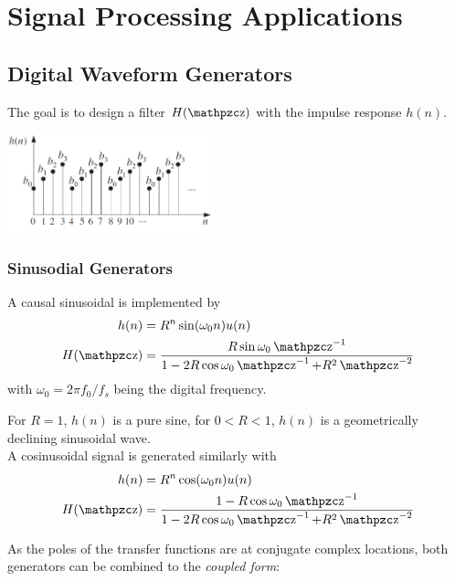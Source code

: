 \section{Signal Processing Applications}
\subsection{Digital Waveform Generators}

The goal is to design a filter $H(\z)$ with the impulse response $h(n)$.

\begin{center} %
	\includegraphics[width=6cm]{images/SignProcApp_DigWaveFormGenerator.jpg}
\end{center}

\subsubsection{Sinusodial Generators}
A causal sinusoidal is implemented by
\begin{align*}
	h(n) &= R^n \sin(\omega_0 n)u(n) \\
	H(\z) &= \frac{R \sin \omega_0 \z^{-1}}{1-2R\cos \omega_0 \z^{-1} + R^2 \z^{-2}}
\end{align*}
with $\omega_0 = 2 \pi f_0 / f_s$ being the digital frequency. 

For $R=1$, $h(n)$ is a pure sine, for $0<R<1$, $h(n)$ is a geometrically declining sinusoidal wave. \\

A cosinusoidal signal is generated similarly with
\begin{align*}
	h(n) &= R^n \cos(\omega_0 n)u(n) \\
	H(\z) &= \frac{1 - R \cos \omega_0 \z^{-1}}{1-2R\cos \omega_0 \z^{-1} + R^2 \z^{-2}}
\end{align*}

As the poles of the transfer functions are at conjugate complex locations, both generators can be combined to the \emph{coupled form}:

